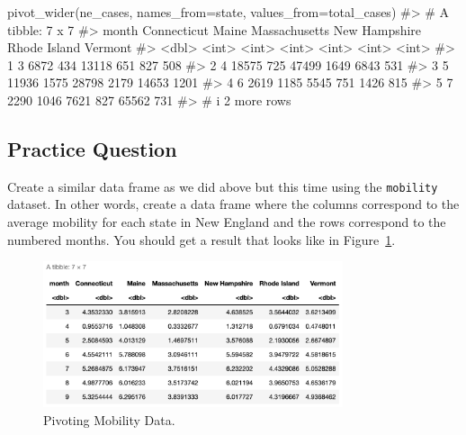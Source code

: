 \documentclass[
  letterpaper,
]{krantz}
\makeatletter
\newenvironment{Shaded}{\begin{snugshade}}{\end{snugshade}}
\newcommand{\AttributeTok}[1]{\textcolor[rgb]{0.40,0.45,0.13}{#1}}
\newcommand{\CommentTok}[1]{\textcolor[rgb]{0.37,0.37,0.37}{#1}}
\newcommand{\FunctionTok}[1]{\textcolor[rgb]{0.28,0.35,0.67}{#1}}
\newcommand{\NormalTok}[1]{\textcolor[rgb]{0.00,0.23,0.31}{#1}}
\newenvironment{kframe}{%
\medskip{}
\setlength{\fboxsep}{.8em}
 \def\at@end@of@kframe{}%
 \ifinner\ifhmode%
  \def\at@end@of@kframe{\end{minipage}}%
  \begin{minipage}{\columnwidth}%
 \fi\fi%
 \def\FrameCommand##1{\hskip\@totalleftmargin \hskip-\fboxsep
 \colorbox{shadecolor}{##1}\hskip-\fboxsep
     \hskip-\linewidth \hskip-\@totalleftmargin \hskip\columnwidth}%
 \MakeFramed {\advance\hsize-\width
   \@totalleftmargin\z@ \linewidth\hsize
   \@setminipage}}%
 {\par\unskip\endMakeFramed%
 \at@end@of@kframe}
\renewenvironment{Shaded}{\begin{kframe}}{\end{kframe}}
\makeatother
\begin{document}
\begin{Shaded}
\begin{Highlighting}[]
\FunctionTok{pivot\_wider}\NormalTok{(ne\_cases, }\AttributeTok{names\_from=}\NormalTok{state, }\AttributeTok{values\_from=}\NormalTok{total\_cases)}
\CommentTok{\#\textgreater{} \# A tibble: 7 x 7}
\CommentTok{\#\textgreater{}   month Connecticut Maine Massachusetts \textasciigrave{}New Hampshire\textasciigrave{} \textasciigrave{}Rhode Island\textasciigrave{} Vermont}
\CommentTok{\#\textgreater{}   \textless{}dbl\textgreater{}       \textless{}int\textgreater{} \textless{}int\textgreater{}         \textless{}int\textgreater{}           \textless{}int\textgreater{}          \textless{}int\textgreater{}   \textless{}int\textgreater{}}
\CommentTok{\#\textgreater{} 1     3        6872   434         13118             651            827     508}
\CommentTok{\#\textgreater{} 2     4       18575   725         47499            1649           6843     531}
\CommentTok{\#\textgreater{} 3     5       11936  1575         28798            2179          14653    1201}
\CommentTok{\#\textgreater{} 4     6        2619  1185          5545             751           1426     815}
\CommentTok{\#\textgreater{} 5     7        2290  1046          7621             827          65562     731}
\CommentTok{\#\textgreater{} \# i 2 more rows}
\end{Highlighting}
\end{Shaded}

\hypertarget{practice-question-11}{%
\subsection{Practice Question}\label{practice-question-11}}

Create a similar data frame as we did above but this time using the
\texttt{mobility} dataset. In other words, create a data frame where the
columns correspond to the average mobility for each state in New England
and the rows correspond to the numbered months. You should get a result
that looks like in Figure~\ref{fig-pq1}.

\begin{figure}

{\centering \includegraphics[width=3.47222in,height=\textheight]{book/images/6-practicequestion1answer.png}

}

\caption{\label{fig-pq1}Pivoting Mobility Data.}

\end{figure}
\end{document}
